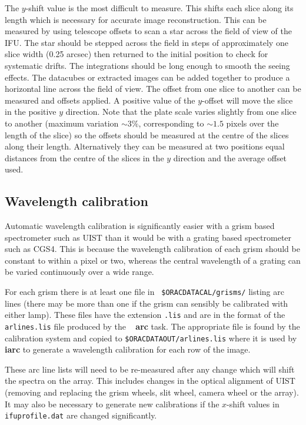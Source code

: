 \documentclass[twoside,11pt]{article}
\newcommand{\xref}[3]{#1}
\renewcommand{\_}{\texttt{\symbol{95}}}
\newcommand{\FIGARO}{\xref{{\sc{Figaro}}}{sun86}{}}
\begin{document}
The $y$-shift value is the most difficult to measure. This shifts each
slice along its length which is necessary for accurate image
reconstruction. This can be measured by using telescope offsets to
scan a star across the field of view of the IFU. The star should be
stepped across the field in steps of approximately one slice width
(0.25 arcsec) then returned to the initial position to check for
systematic drifts. The integrations should be long enough to smooth
the seeing effects.  The datacubes or extracted images can be added
together to produce a horizontal line across the field of view. The
offset from one slice to another can be measured and offsets applied.
A positive value of the $y$-offset will move the slice in the positive
$y$ direction. Note that the plate scale varies slightly from one
slice to another (maximum variation $\sim 3\%$, corresponding to $\sim
1.5$ pixels over the length of the slice) so the offsets should be
measured at the centre of the slices along their length. Alternatively
they can be measured at two positions equal distances from the centre
of the slices in the $y$ direction and the average offset used.





\subsection{Wavelength calibration}
\label{arclines}

Automatic wavelength calibration is significantly easier with a grism
based spectrometer such as UIST than it would be with a grating based
spectrometer such as CGS4. This is because the wavelength calibration of each
grism should be constant to within a pixel or two, whereas the central
wavelength of a grating can be varied continuously over a wide range.

For each grism there is at least one file in {\tt
  \$ORAC\_DATA\_CAL/grisms/} listing arc lines (there may be more than
one if the grism can sensibly be calibrated with either lamp). These
files have the extension {\tt .lis} and are in the format of the {\tt
  arlines.lis} file produced by the \FIGARO\ \xref{{\bf
    arc}}{sun86}{ARC} task. The appropriate file is found by the
calibration system and copied to {\tt \$ORAC\_DATA\_OUT/arlines.lis}
where it is used by \xref{{\bf iarc}}{sun86}{IARC} to generate a
wavelength calibration for each row of the image.

These arc line lists will need to be re-measured after any change
which will shift the spectra on the array. This includes changes in
the optical alignment of UIST (removing and replacing the grism
wheels, slit wheel, camera wheel or the array). It may also be
necessary to generate new calibrations if the $x$-shift values in {\tt
  ifu\_profile.dat} are changed significantly.
\end{document}
